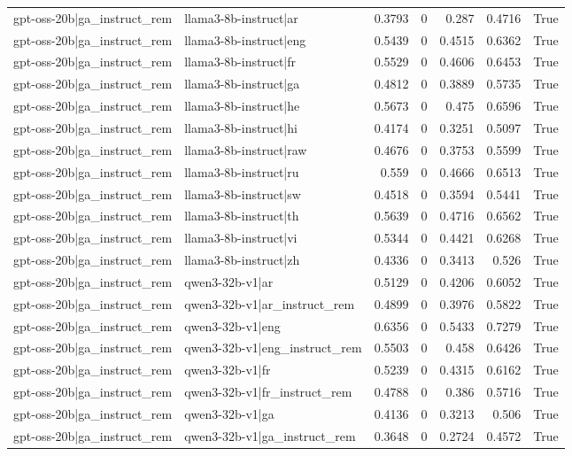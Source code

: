 \begin{table}
\begin{tabular}{l l r r r r l}
gpt-oss-20b|ga_instruct_rem & llama3-8b-instruct|ar & 0.3793 & 0 & 0.287 & 0.4716 & True \\
gpt-oss-20b|ga_instruct_rem & llama3-8b-instruct|eng & 0.5439 & 0 & 0.4515 & 0.6362 & True \\
gpt-oss-20b|ga_instruct_rem & llama3-8b-instruct|fr & 0.5529 & 0 & 0.4606 & 0.6453 & True \\
gpt-oss-20b|ga_instruct_rem & llama3-8b-instruct|ga & 0.4812 & 0 & 0.3889 & 0.5735 & True \\
gpt-oss-20b|ga_instruct_rem & llama3-8b-instruct|he & 0.5673 & 0 & 0.475 & 0.6596 & True \\
gpt-oss-20b|ga_instruct_rem & llama3-8b-instruct|hi & 0.4174 & 0 & 0.3251 & 0.5097 & True \\
gpt-oss-20b|ga_instruct_rem & llama3-8b-instruct|raw & 0.4676 & 0 & 0.3753 & 0.5599 & True \\
gpt-oss-20b|ga_instruct_rem & llama3-8b-instruct|ru & 0.559 & 0 & 0.4666 & 0.6513 & True \\
gpt-oss-20b|ga_instruct_rem & llama3-8b-instruct|sw & 0.4518 & 0 & 0.3594 & 0.5441 & True \\
gpt-oss-20b|ga_instruct_rem & llama3-8b-instruct|th & 0.5639 & 0 & 0.4716 & 0.6562 & True \\
gpt-oss-20b|ga_instruct_rem & llama3-8b-instruct|vi & 0.5344 & 0 & 0.4421 & 0.6268 & True \\
gpt-oss-20b|ga_instruct_rem & llama3-8b-instruct|zh & 0.4336 & 0 & 0.3413 & 0.526 & True \\
gpt-oss-20b|ga_instruct_rem & qwen3-32b-v1|ar & 0.5129 & 0 & 0.4206 & 0.6052 & True \\
gpt-oss-20b|ga_instruct_rem & qwen3-32b-v1|ar_instruct_rem & 0.4899 & 0 & 0.3976 & 0.5822 & True \\
gpt-oss-20b|ga_instruct_rem & qwen3-32b-v1|eng & 0.6356 & 0 & 0.5433 & 0.7279 & True \\
gpt-oss-20b|ga_instruct_rem & qwen3-32b-v1|eng_instruct_rem & 0.5503 & 0 & 0.458 & 0.6426 & True \\
gpt-oss-20b|ga_instruct_rem & qwen3-32b-v1|fr & 0.5239 & 0 & 0.4315 & 0.6162 & True \\
gpt-oss-20b|ga_instruct_rem & qwen3-32b-v1|fr_instruct_rem & 0.4788 & 0 & 0.386 & 0.5716 & True \\
gpt-oss-20b|ga_instruct_rem & qwen3-32b-v1|ga & 0.4136 & 0 & 0.3213 & 0.506 & True \\
gpt-oss-20b|ga_instruct_rem & qwen3-32b-v1|ga_instruct_rem & 0.3648 & 0 & 0.2724 & 0.4572 & True \\

\end{tabular}
\end{table}
